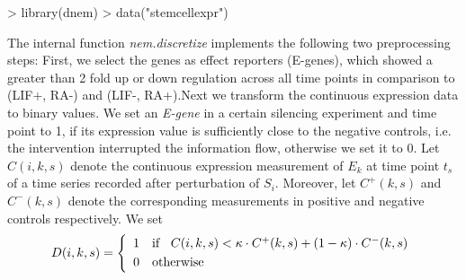 \documentclass[11pt,a4paper]{article}
\begin{document}

\begin{Schunk}
\begin{Sinput}
> library(dnem)
> data("stemcellexpr")
\end{Sinput}
\end{Schunk}

The internal function \textit{nem.discretize} implements the following two preprocessing steps:
First, we select the genes as effect reporters (E-genes), which showed a greater than 2 fold up or 
down regulation across all time points in  comparison to (LIF+, RA-) and (LIF-, RA+).Next we transform the continuous expression data to binary values. We set an \textit{E-gene} in a certain silencing experiment and time point to 1, if its expression value is sufficiently close to the negative controls, i.e. the intervention interrupted the information flow, 
otherwise we set it to 0. 
Let $C(i,k,s)$ denote the continuous expression measurement of $E_k$ at time point $t_s$ of a time series recorded 
after perturbation of $S_i$. Moreover, let $C^+(k,s)$ and $C^-(k,s)$ denote the corresponding measurements
in positive and negative controls respectively. We set   
\begin{equation}\label{binary}
   D{(i,k,s)}=\left\{
            \begin{array}{ll}
            1 & \mbox{if} \hspace{0.2cm} \,\, C(i,k,s) < \kappa \cdot C^+(k,s) +  (1-\kappa) \cdot C^-(k,s) \smallskip \\
            0 & \mbox{otherwise} \\ 
            \end{array}\right.
\end{equation}
\end{document}
